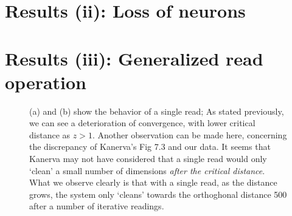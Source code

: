 


\chapter{Results (ii): Loss of neurons}


\chapter{Results (iii): Generalized read operation}

\begin{figure}[h!]
  \centering


  \caption{(a) and (b) show the behavior of a single read; As stated previously, we can see a deterioration of convergence, with lower critical distance as $z>1$.  Another observation can be made here, concerning the discrepancy of Kanerva's Fig 7.3 and our data.  It seems that Kanerva may not have considered that a single read would only `clean' a small number of dimensions \emph{after the critical distance}. What we observe clearly is that with a single read, as the distance grows, the system only `cleans' towards the orthoghonal distance 500 after a number of iterative readings.}
  \label{fig:murillo-generalization-experiments}
\end{figure}


